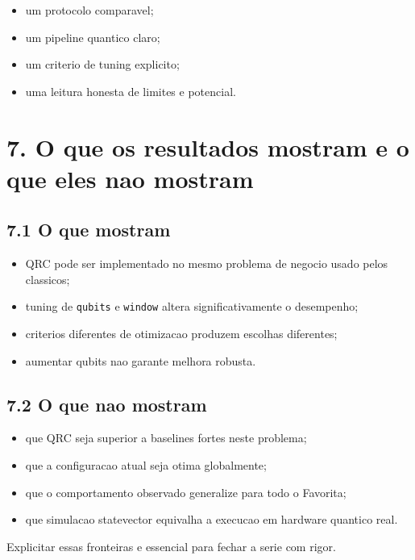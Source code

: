 \documentclass[12pt]{article}
\providecommand{\tightlist}{%
  \setlength{\itemsep}{0pt}\setlength{\parskip}{0pt}}
\begin{document}
\begin{itemize}
\tightlist
\item
  um protocolo comparavel;
\item
  um pipeline quantico claro;
\item
  um criterio de tuning explicito;
\item
  uma leitura honesta de limites e potencial.
\end{itemize}

\section{7. O que os resultados mostram e o que eles nao mostram}\label{7-o-que-os-resultados-mostram-e-o-que-eles-nao-mostram}

\subsection{7.1 O que mostram}\label{71-o-que-mostram}

\begin{itemize}
\tightlist
\item
  QRC pode ser implementado no mesmo problema de negocio usado pelos classicos;
\item
  tuning de \texttt{qubits} e \texttt{window} altera significativamente o desempenho;
\item
  criterios diferentes de otimizacao produzem escolhas diferentes;
\item
  aumentar qubits nao garante melhora robusta.
\end{itemize}

\subsection{7.2 O que nao mostram}\label{72-o-que-nao-mostram}

\begin{itemize}
\tightlist
\item
  que QRC seja superior a baselines fortes neste problema;
\item
  que a configuracao atual seja otima globalmente;
\item
  que o comportamento observado generalize para todo o Favorita;
\item
  que simulacao statevector equivalha a execucao em hardware quantico real.
\end{itemize}

Explicitar essas fronteiras e essencial para fechar a serie com rigor.
\end{document}
